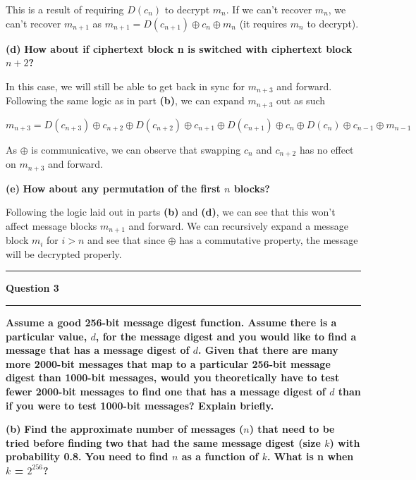 \documentclass[11pt]{article}
\newcommand\question[2]{\vspace{.25in}\hrule\textbf{#1}\vspace{.5em}\hrule\vspace{.10in}}
\renewcommand\part[1]{\vspace{.10in}\textbf{(#1)}}
\begin{document}
This is a result of requiring $D(c_n)$ to decrypt $m_n$. If we can't recover $m_n$, we can't recover $m_{n+1}$ as $m_{n+1} = D(c_{n+1}) \oplus c_n \oplus m_n$ (it requires $m_n$ to decrypt).

\part{d} \textbf{How about if ciphertext block n is switched with ciphertext block $n + 2$?} \newline

In this case, we will still be able to get back in sync for $m_{n+3}$ and forward. Following the same logic as in part \textbf{(b)}, we can expand $m_{n+3}$ out as such

$$m_{n+3} = D(c_{n+3}) \oplus c_{n + 2} \oplus D(c_{n+2}) \oplus c_{n+1} \oplus D(c_{n+1}) \oplus c_{n} \oplus D(c_n) \oplus c_{n-1} \oplus m_{n-1}$$

As $\oplus$ is communicative, we can observe that swapping $c_n$ and $c_{n+2}$ has no effect on $m_{n+3}$ and forward.

\part{e} \textbf{How about any permutation of the first $n$ blocks?} \newline

Following the logic laid out in parts \textbf{(b)} and \textbf{(d)}, we can see that this won't affect message blocks $m_{n+1}$ and forward. We can recursively expand a message block $m_i$ for $i > n$ and see that since $\oplus$ has a commutative property, the message will be decrypted properly.

\question{Question 3}

\part{a} \textbf{Assume a good 256-bit message digest function. Assume there is a
particular value, $d$, for the message digest and you would like to find a message
that has a message digest of $d$. Given that there are many more 2000-bit messages
that map to a particular 256-bit message digest than 1000-bit messages, would
you theoretically have to test fewer 2000-bit messages to find one that has a
message digest of $d$ than if you were to test 1000-bit messages? Explain briefly.}

\part{b} \textbf{ Find the approximate number of messages ($n$) that need to be tried
before finding two that had the same message digest (size $k$) with probability 0.8.
You need to find $n$ as a function of $k$. What is n when $k$ = $2^{256}$?}
\end{document}
